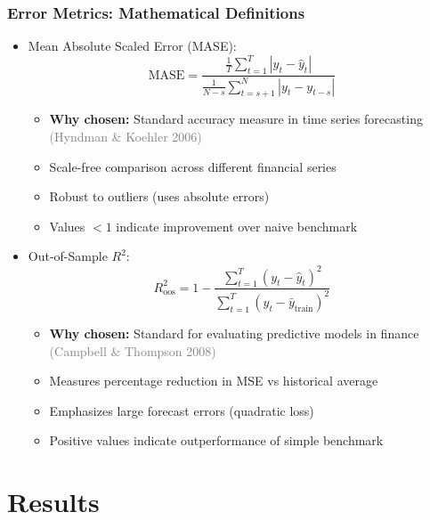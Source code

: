 \documentclass[ignorenonframetext, 9pt]{beamer}
\begin{document}
\begin{frame}
  \frametitle{Error Metrics: Mathematical Definitions}
  \begin{itemize}
  \item \alert{Mean Absolute Scaled Error (MASE):}
  \[
  \mathrm{MASE}=\frac{\frac{1}{T}\sum_{t=1}^T |y_t-\hat y_t|}
  {\displaystyle \frac{1}{N-s}\sum_{t=s+1}^{N} |y_t - y_{t-s}|}
  \]
  \begin{itemize}
    \item \textbf{Why chosen:} Standard accuracy measure in time series forecasting \textcolor{gray}{(Hyndman \& Koehler 2006)}
    \item Scale-free comparison across different financial series
    \item Robust to outliers (uses absolute errors)
    \item Values $<1$ indicate improvement over naive benchmark
  \end{itemize}
  \vspace{0.3cm}
  \item \alert{Out-of-Sample $R^2$:}
  \[
  R^2_{\text{oos}} = 1 - \frac{\sum_{t=1}^T (y_t-\hat y_t)^2}{\sum_{t=1}^T (y_t-\bar{y}_{\text{train}})^2}
  \]
  \begin{itemize}
    \item \textbf{Why chosen:} Standard for evaluating predictive models in finance \textcolor{gray}{(Campbell \& Thompson 2008)}
    \item Measures percentage reduction in MSE vs historical average
    \item Emphasizes large forecast errors (quadratic loss)
    \item Positive values indicate outperformance of simple benchmark
  \end{itemize}
  \end{itemize}
\end{frame}

\section{Results}
\end{document}
